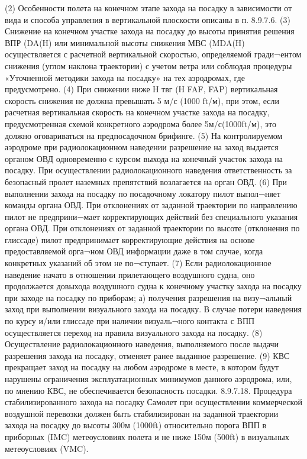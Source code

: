 (2) Особенности полета на конечном этапе захода на посадку в зависимости от вида и способа управления в вертикальной плоскости описаны в п. 8.9.7.6.
(3) Снижение на конечном участке захода на посадку до высоты принятия решения ВПР (DA(H) или минимальной высоты снижения МВС (MDA(H) осуществляется с расчетной вертикальной скоростью, определяемой гради¬ентом снижения (углом наклона траектории) с учетом ветра или соблюдая процедуры «Уточненной методики захода на посадку» на тех аэродромах, где предусмотрено.
(4) При снижении ниже Н твг (Н FAF, FAP) вертикальная скорость снижения не должна превышать 5 м/с (1000 ft/м), при этом, если расчетная вертикальная скорость на конечном участке захода на посадку, предусмотренная схемой конкретного аэродрома более 5м/с(1000ft/м), это должно оговариваться на предпосадочном брифинге.
(5) На контролируемом аэродроме при радиолокационном наведении разрешение на заход выдается органом ОВД одновременно с курсом выхода на конечный участок захода на посадку.
При осуществлении радиолокационного наведения ответственность за безопасный пролет наземных препятствий возлагается на орган ОВД.
(6) При выполнении захода на посадку по посадочному локатору пилот выпол¬няет команды органа ОВД.
При отклонениях от заданной траектории по направлению пилот не предприни¬мает корректирующих действий без специального указания органа ОВД.
При отклонениях от заданной траектории по высоте (отклонения по глиссаде) пилот предпринимает корректирующие действия на основе предоставляемой орга¬ном ОВД информации даже в том случае, когда конкретных указаний об этом не по¬ступает.
(7) Если радиолокационное наведение начато в отношении прилетающего воздушного судна, оно продолжается довыхода воздушного судна к конечному участку захода на посадку при заходе на посадку по приборам;
а)	получения разрешения на визу¬альный заход при выполнении визуального захода на посадку.
В случае потери наведения по курсу и/или глиссаде при наличии визуаль¬ного контакта с ВПП осуществляется переход на правила визуального захода на посадку.
(8) Осуществление радиолокационного наведения, выполняемого после выдачи разрешения захода на посадку, отменяет ранее выданное разрешение.
(9) КВС прекращает заход на посадку на любом аэродроме в месте, в котором будут нарушены ограничения эксплуатационных минимумов данного аэродрома, или, по мнению КВС, не обеспечивается безопасность посадки.
8.9.7.18.	Процедура стабилизированного захода на посадку
Самолет при осуществлении коммерческой воздушной перевозки должен быть стабилизирован на заданной траектории захода на посадку до высоты 300м (1000ft) относительно порога ВПП в приборных (IMC) метеоусловиях полета и не ниже 150м (500ft) в визуальных метеоусловиях (VMC).
